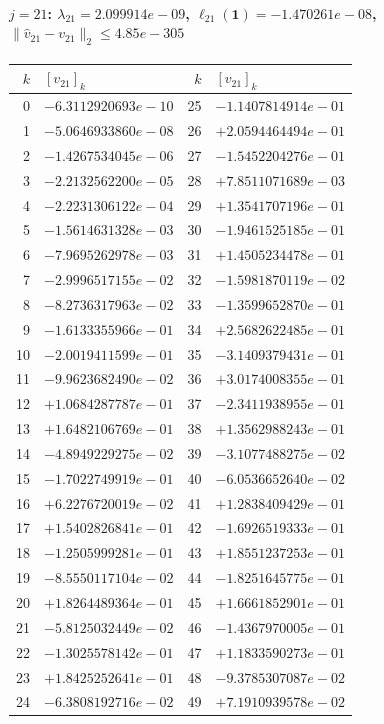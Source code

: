\paragraph{$j = 21$: $\lambda_{21} = 2.099914e-09$, \quad $\ell_{21}(\mathbf{1}) = -1.470261e-08$, \quad $\|\hat{v}_{21} - v_{21}\|_2 \leq 4.85e-305$}
\begin{center}
{\footnotesize
\begin{tabular}{r@{\;\;}l@{\quad}r@{\;\;}l}
\toprule
$k$ & $[v_{21}]_k$ & $k$ & $[v_{21}]_k$ \\
\midrule
0 & $-6.3112920693e-10$ & 25 & $-1.1407814914e-01$ \\
1 & $-5.0646933860e-08$ & 26 & $+2.0594464494e-01$ \\
2 & $-1.4267534045e-06$ & 27 & $-1.5452204276e-01$ \\
3 & $-2.2132562200e-05$ & 28 & $+7.8511071689e-03$ \\
4 & $-2.2231306122e-04$ & 29 & $+1.3541707196e-01$ \\
5 & $-1.5614631328e-03$ & 30 & $-1.9461525185e-01$ \\
6 & $-7.9695262978e-03$ & 31 & $+1.4505234478e-01$ \\
7 & $-2.9996517155e-02$ & 32 & $-1.5981870119e-02$ \\
8 & $-8.2736317963e-02$ & 33 & $-1.3599652870e-01$ \\
9 & $-1.6133355966e-01$ & 34 & $+2.5682622485e-01$ \\
10 & $-2.0019411599e-01$ & 35 & $-3.1409379431e-01$ \\
11 & $-9.9623682490e-02$ & 36 & $+3.0174008355e-01$ \\
12 & $+1.0684287787e-01$ & 37 & $-2.3411938955e-01$ \\
13 & $+1.6482106769e-01$ & 38 & $+1.3562988243e-01$ \\
14 & $-4.8949229275e-02$ & 39 & $-3.1077488275e-02$ \\
15 & $-1.7022749919e-01$ & 40 & $-6.0536652640e-02$ \\
16 & $+6.2276720019e-02$ & 41 & $+1.2838409429e-01$ \\
17 & $+1.5402826841e-01$ & 42 & $-1.6926519333e-01$ \\
18 & $-1.2505999281e-01$ & 43 & $+1.8551237253e-01$ \\
19 & $-8.5550117104e-02$ & 44 & $-1.8251645775e-01$ \\
20 & $+1.8264489364e-01$ & 45 & $+1.6661852901e-01$ \\
21 & $-5.8125032449e-02$ & 46 & $-1.4367970005e-01$ \\
22 & $-1.3025578142e-01$ & 47 & $+1.1833590273e-01$ \\
23 & $+1.8425252641e-01$ & 48 & $-9.3785307087e-02$ \\
24 & $-6.3808192716e-02$ & 49 & $+7.1910939578e-02$ \\
\bottomrule
\end{tabular}
}
\end{center}

